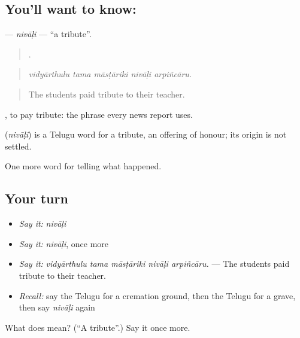\subsection*{You'll want to know: }
\textbf{} — \emph{nivāḷi} — \textquotedblleft{}a tribute\textquotedblright{}.

\begin{quote}
    .
\end{quote}

\begin{quote}
\emph{vidyārthulu tama māsṭāriki nivāḷi arpiñcāru.}
\end{quote}

\begin{quote}
The students paid tribute to their teacher.
\end{quote}

 , to pay tribute: the phrase every news report uses.

\begin{cousinweb}
\textbf{} (\emph{nivāḷi}) is a Telugu word for a tribute, an offering of honour; its origin is not settled.
\end{cousinweb}

\begin{grammarlens}[title={What you've built}]
One more word for telling what happened.
\end{grammarlens}

\subsection*{Your turn}
\begin{itemize}
\raggedright
  \item \emph{Say it:} \emph{nivāḷi}
  \item \emph{Say it:} \emph{nivāḷi}, once more
  \item \emph{Say it:} \emph{vidyārthulu tama māsṭāriki nivāḷi arpiñcāru.} — The students paid tribute to their teacher.
  \item \emph{Recall:} say the Telugu for a cremation ground, then the Telugu for a grave, then say \emph{nivāḷi} again
\end{itemize}

\begin{tcolorbox}[breakable,colback=teal!4,colframe=teal!35!black,title={Before you move on}]
What does  mean? (\textquotedblleft{}A tribute\textquotedblright{}.) Say it once more.
\end{tcolorbox}
